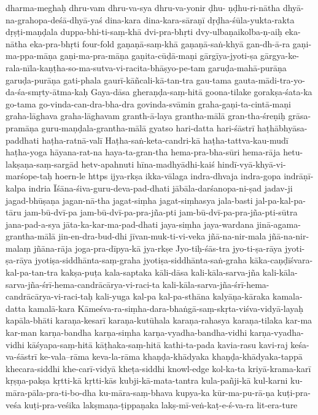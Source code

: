 {dharma-meghaḥ
dhru-vam
dhru-va-sya
dhru-va-yonir
ḍhu- ṇḍhu-ri-nātha
dhyā-na-grahopa-deśā-dhyā-yaś
dina-kara
dina-kara-sāraṇī
dṛḍha-śūla-yukta-rakta
dṛṣṭi-maṇḍala
duppa-bhi-ti-saṃ-khā
dvi-pra-bhṛti
dvy-ulbaṇaikolba-ṇ-aiḥ
eka-nātha
eka-pra-bhṛti
four-fold
gaṇaṇā-saṃ-khā
gaṇaṇā-saṅ-khyā
gan-dh-ā-ra
gaṇi-ma-ppa-māṇa
gaṇi-ma-pra-māṇa
gaṇita-cūḍā-maṇi
gārgīya-jyoti-ṣa
gārgya-ke-rala-nīla-kaṇṭha-so-ma-sutva-vi-racita-bhāṣyo-pe-tam
garuḍa-mahā-purāṇa
garuḍa-purāṇa
gati-phala
gaurī-kāñcali-kā-tan-tra
gau-tama
gauta-mādi-tra-yo-da-śa-smṛty-ātma-kaḥ
Gaya-dāsa
gheraṇḍa-saṃ-hitā
goona-tilake
gorakṣa-śata-ka
go-tama
go-vinda-can-dra-bha-dra
govinda-svāmin
graha-gaṇi-ta-cintā-maṇi
graha-lāghava
graha-lāghavam
granth-ā-laya
grantha-mālā
gran-tha-śreṇiḥ
grāsa-pramāṇa
guru-maṇḍala-grantha-mālā
gyatso
hari-datta
hari-śāstrī
haṭhābhyāsa-paddhati
haṭha-ratnā-valī
Haṭha-saṅ-keta-candri-kā
haṭha-tattva-kau-mudī
haṭha-yoga
hāyana-rat-na
haya-ta-gran-tha
hema-pra-bha-sūri
hema-rāja
hetu-lakṣaṇa-saṃ-sargād
hetv-apahnuti
hīna-madhyādhi-kaiś
hindī-vyā-khyā-vi-marśope-taḥ
hoern-le
https
ijya-rkṣa
ikka-vālaga
indra-dhvaja
indra-gopa
indrāṇī-kalpa
indria
Īśāna-śiva-guru-deva-pad-dhati
jābāla-darśanopa-ni-ṣad
jadav-ji
jagad-bhūṣaṇa
jagan-nā-tha
jagat-siṃha
jagat-siṃhasya
jala-basti
jal-pa-kal-pa-tāru
jam-bū-dvī-pa
jam-bū-dvī-pa-pra-jña-pti
jam-bū-dvī-pa-pra-jña-pti-sūtra
jana-pad-a-sya
jāta-ka-kar-ma-pad-dhati
jaya-siṃha
jaya-wardana
jinā-agama-grantha-mālā
jin-en-dra-bud-dhi
jīvan-muk-ti-vi-veka
jñā-na-nir-mala
jñā-na-nir-malaṃ
jñāna-rāja
joga-pra-dīpya-kā
jya-rkṣe
Jyo-tiḥ-śās-tra
jyo-ti-ṣa-rāya
jyoti-ṣa-rāya
jyotiṣa-siddhānta-saṃ-graha
jyotiṣa-siddhānta-saṅ-graha
kāka-caṇḍīśvara-kal-pa-tan-tra
kakṣa-puṭa
kala-saptaka
kāli-dāsa
kali-kāla-sarva-jña
kali-kāla-sarva-jña-śrī-hema-candrācārya-vi-raci-ta
kali-kāla-sarva-jña-śrī-hema-candrācārya-vi-raci-taḥ
kali-yuga
kal-pa
kal-pa-sthāna
kalyāṇa-kāraka
kamala-datta
kamalā-kara
Kāmeśva-ra-siṃha-dara-bhaṅgā-saṃ-skṛta-viśva-vidyā-layaḥ
kapāla-bhāti
karaṇa-kesarī
karaṇa-kutūhala
karaṇa-rahasya
karaṇa-tilaka
kar-ma
kar-man
karṇa-bandha
karṇa-siṃha
karṇa-vyadha-bandha-vidhi
karṇa-vyadha-vidhi
kāśyapa-saṃ-hitā
kāṭhaka-saṃ-hitā
kathi-ta-pada
kavia-rasu
kavi-raj
keśa-va-śāstrī
ke-vala--rāma
keva-la-rāma
khaṇḍa-khādyaka
khaṇḍa-khādyaka-tappā
khecara-siddhi
khe-carī-vidyā
kheṭa-siddhi
knowl-edge
kol-ka-ta
kriyā-krama-karī
kṛṣṇa-pakṣa
kṛtti-kā
kṛtti-kās
kubji-kā-mata-tantra
kula-pañji-kā
kul-karni
ku-māra-pāla-pra-ti-bo-dha
ku-māra-saṃ-bhava
kupya-ka
kūr-ma-pu-rā-ṇa
kuṭi-pra-veśa
kuṭi-pra-veśika
lakṣmaṇa-ṭippaṇaka
lakṣ-mī-veṅ-kaṭ-e-ś-va-ra
lit-era-ture
}
